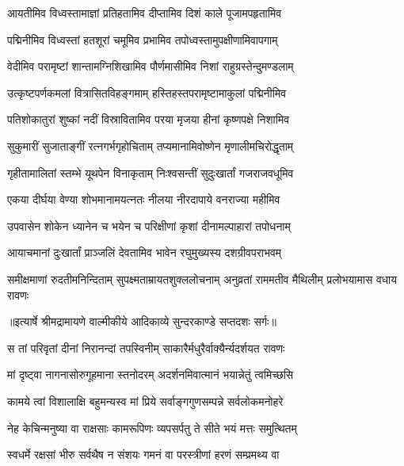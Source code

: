 \twolineshloka
{आयतीमिव विध्वस्तामाज्ञां प्रतिहतामिव}
{दीप्तामिव दिशं काले पूजामपहृतामिव} %

\twolineshloka
{पद्मिनीमिव विध्वस्तां हतशूरां चमूमिव}
{प्रभामिव तपोध्वस्तामुपक्षीणामिवापगाम्} %

\twolineshloka
{वेदीमिव परामृष्टां शान्तामग्निशिखामिव}
{पौर्णमासीमिव निशां राहुग्रस्तेन्दुमण्डलाम्} %

\twolineshloka
{उत्कृष्टपर्णकमलां वित्रासितविहङ्गमाम्}
{हस्तिहस्तपरामृष्टामाकुलां पद्मिनीमिव} %

\twolineshloka
{पतिशोकातुरां शुष्कां नदीं विस्रावितामिव}
{परया मृजया हीनां कृष्णपक्षे निशामिव} %

\twolineshloka
{सुकुमारीं सुजाताङ्गीं रत्नगर्भगृहोचिताम्}
{तप्यमानामिवोष्णेन मृणालीमचिरोद्धृताम्} %

\twolineshloka
{गृहीतामालितां स्तम्भे यूथपेन विनाकृताम्}
{निःश्वसन्तीं सुदुःखार्तां गजराजवधूमिव} %

\twolineshloka
{एकया दीर्घया वेण्या शोभमानामयत्नतः}
{नीलया नीरदापाये वनराज्या महीमिव} %

\twolineshloka
{उपवासेन शोकेन ध्यानेन च भयेन च}
{परिक्षीणां कृशां दीनामल्पाहारां तपोधनाम्} %

\twolineshloka
{आयाचमानां दुःखार्तां प्राञ्जलिं देवतामिव}
{भावेन रघुमुख्यस्य दशग्रीवपराभवम्} %

\fourlineindentedshloka
{समीक्षमाणां रुदतीमनिन्दिताम्}
{सुपक्ष्मताम्रायतशुक्ललोचनाम्}
{अनुव्रतां राममतीव मैथिलीम्}
{प्रलोभयामास वधाय रावणः} %


{॥इत्यार्षे श्रीमद्रामायणे वाल्मीकीये आदिकाव्ये सुन्दरकाण्डे सप्तदशः सर्गः॥}


\twolineshloka
{स तां परिवृतां दीनां निरानन्दां तपस्विनीम्}
{साकारैर्मधुरैर्वाक्यैर्न्यदर्शयत रावणः} %

\twolineshloka
{मां दृष्ट्वा नागनासोरुगूहमाना स्तनोदरम्}
{अदर्शनमिवात्मानं भयान्नेतुं त्वमिच्छसि} %

\twolineshloka
{कामये त्वां विशालाक्षि बहुमन्यस्व मां प्रिये}
{सर्वाङ्गगुणसम्पन्ने सर्वलोकमनोहरे} %

\twolineshloka
{नेह केचिन्मनुष्या वा राक्षसाः कामरूपिणः}
{व्यपसर्पतु ते सीते भयं मत्तः समुत्थितम्} %

\twolineshloka
{स्वधर्मे रक्षसां भीरु सर्वथैष न संशयः}
{गमनं वा परस्त्रीणां हरणं सम्प्रमथ्य वा} %

